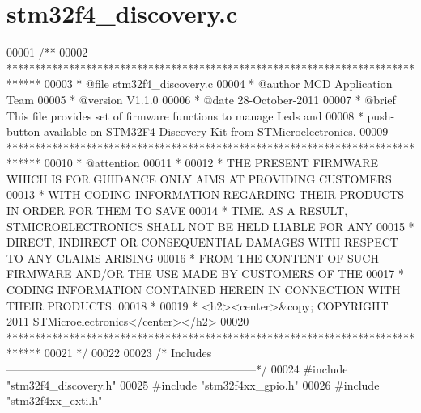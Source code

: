 \section{stm32f4\+\_\+discovery.\+c}
\label{stm32f4__discovery_8c_source}

\begin{DoxyCode}
00001 \textcolor{comment}{/**}
00002 \textcolor{comment}{  ******************************************************************************}
00003 \textcolor{comment}{  * @file    stm32f4\_discovery.c}
00004 \textcolor{comment}{  * @author  MCD Application Team}
00005 \textcolor{comment}{  * @version V1.1.0}
00006 \textcolor{comment}{  * @date    28-October-2011}
00007 \textcolor{comment}{  * @brief   This file provides set of firmware functions to manage Leds and}
00008 \textcolor{comment}{  *          push-button available on STM32F4-Discovery Kit from STMicroelectronics.}
00009 \textcolor{comment}{  ******************************************************************************}
00010 \textcolor{comment}{  * @attention}
00011 \textcolor{comment}{  *}
00012 \textcolor{comment}{  * THE PRESENT FIRMWARE WHICH IS FOR GUIDANCE ONLY AIMS AT PROVIDING CUSTOMERS}
00013 \textcolor{comment}{  * WITH CODING INFORMATION REGARDING THEIR PRODUCTS IN ORDER FOR THEM TO SAVE}
00014 \textcolor{comment}{  * TIME. AS A RESULT, STMICROELECTRONICS SHALL NOT BE HELD LIABLE FOR ANY}
00015 \textcolor{comment}{  * DIRECT, INDIRECT OR CONSEQUENTIAL DAMAGES WITH RESPECT TO ANY CLAIMS ARISING}
00016 \textcolor{comment}{  * FROM THE CONTENT OF SUCH FIRMWARE AND/OR THE USE MADE BY CUSTOMERS OF THE}
00017 \textcolor{comment}{  * CODING INFORMATION CONTAINED HEREIN IN CONNECTION WITH THEIR PRODUCTS.}
00018 \textcolor{comment}{  *}
00019 \textcolor{comment}{  * <h2><center>&copy; COPYRIGHT 2011 STMicroelectronics</center></h2>}
00020 \textcolor{comment}{  ******************************************************************************}
00021 \textcolor{comment}{  */}
00022 
00023 \textcolor{comment}{/* Includes ------------------------------------------------------------------*/}
00024 \textcolor{preprocessor}{#}\textcolor{preprocessor}{include} "stm32f4_discovery.h"
00025 \textcolor{preprocessor}{#}\textcolor{preprocessor}{include} "stm32f4xx_gpio.h"
00026 \textcolor{preprocessor}{#}\textcolor{preprocessor}{include} "stm32f4xx_exti.h"

\end{DoxyCode}
